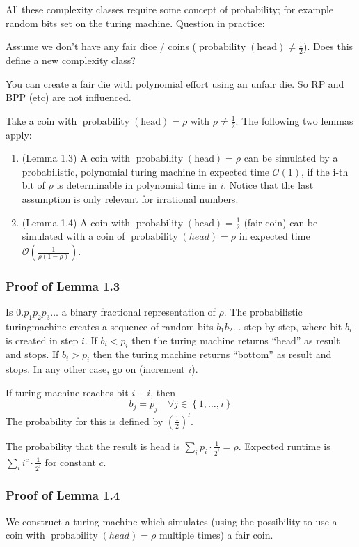 \documentclass[a4paper]{article}
\newcommand{\cls}[1]{\rm{#1}}
\newcommand{\set}[1]{\left\{#1\right\}}
\DeclareMathOperator{\prop}{probability}
\begin{document}
All these complexity classes require some concept of probability;
for example random bits set on the turing machine. Question in practice:

Assume we don't have any fair dice / coins ($\prop{(\text{head})} \neq \frac12$).
Does this define a new complexity class?

You can create a fair die with polynomial effort using an unfair die.
So \cls{RP} and \cls{BPP} (etc) are not influenced.

Take a coin with $\prop{(\text{head})} = \rho$ with $\rho \neq \frac12$.
The following two lemmas apply:
\begin{enumerate}
  \item (Lemma 1.3) A coin with $\prop{(\text{head})} = \rho$ can be simulated
         by a probabilistic, polynomial turing machine in expected time
         $\mathcal{O}(1)$, if the i-th bit of $\rho$ is determinable
         in polynomial time in $i$.
         Notice that the last assumption is only relevant for irrational
         numbers.
  \item (Lemma 1.4) A coin with $\prop{(\text{head})} = \frac12$ (fair coin)
        can be simulated with a coin of $\prop(head) = \rho$ in expected time
        $\mathcal{O}\left(\frac{1}{\rho (1-\rho)}\right)$.
\end{enumerate}

\subsubsection{Proof of Lemma 1.3}
%
Is $0.p_1 p_2 p_3\ldots$ a binary fractional representation of $\rho$.
The probabilistic turingmachine creates a sequence of random bits
$b_1 b_2 \ldots$ step by step, where bit $b_i$ is created in step $i$.
If $b_i < p_i$ then the turing machine returns ``head'' as result and stops.
If $b_i > p_i$ then the turing machine returns ``bottom'' as result and stops.
In any other case, go on (increment $i$).

If turing machine reaches bit $i+i$, then
\[
    b_j = p_j  \quad \forall j \in \set{1,\ldots,i}
\]
The probability for this is defined by $(\frac12)^l$.

The probability that the result is head is $\sum_i p_i \cdot \frac{1}{2^i} = \rho$.
Expected runtime is $\sum_i i^c \cdot \frac{1}{2^i}$ for constant $c$.

\subsubsection{Proof of Lemma 1.4}
%
We construct a turing machine which simulates (using the possibility to
use a coin with $\prop(head) = \rho$ multiple times) a fair coin.
\end{document}
